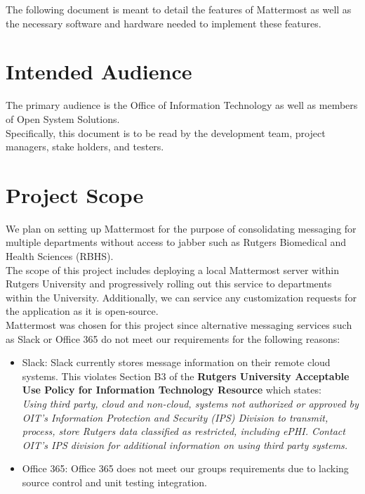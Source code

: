 \documentclass{scrreprt}
\begin{document}
The following document is meant to detail the features of Mattermost as well as
the necessary software and hardware needed to implement these features.

\section{Intended Audience}
The primary audience is the Office of Information Technology as well as members
of Open System Solutions.\\

Specifically, this document is to be read by the development team,
project managers, stake holders, and testers.

\section{Project Scope}
We plan on setting up Mattermost for the purpose of consolidating messaging for
multiple departments without access to jabber such as Rutgers Biomedical
and Health Sciences (RBHS).\\

The scope of this project includes deploying a local Mattermost server within
Rutgers University and progressively rolling out this service to departments
within the University.  Additionally, we can service any customization requests
for the application as it is open-source.\\

Mattermost was chosen for this project since alternative messaging services such
as Slack or Office 365 do not meet our requirements for the following reasons:
\begin{itemize}
  \item Slack: Slack currently stores message information on their remote
    cloud systems.  This violates Section B3 of the \textbf{Rutgers University Acceptable
    Use Policy for Information Technology Resource} which states:\\
    \noindent
    \textit{Using third party, cloud and non-cloud, systems not authorized or 
      approved by OIT’s Information Protection and Security (IPS) Division to 
      transmit, process, store Rutgers data classified as restricted, including 
      ePHI. Contact OIT’s IPS division for additional information on using 
      third party systems.}
  \item Office 365: Office 365 does not meet our groups requirements due to
    lacking source control and unit testing integration.
\end{itemize}
\end{document}
